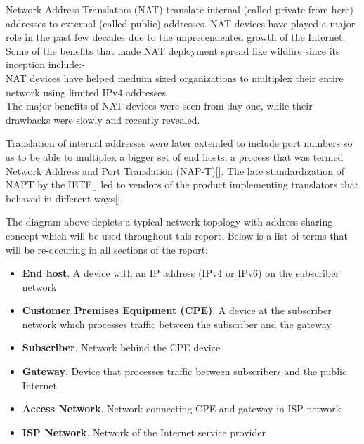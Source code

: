\documentclass[iwp,first]{luthesis}
\begin{document}
Network Address Translators (NAT) translate internal (called private from here) addresses  to external (called public) addresses. NAT devices have played a major role in the past few decades due to the unprecendented growth of the Internet. Some of the benefits that made NAT deployment spread like wildfire since its inception include:- 
\\ NAT devices have helped meduim sized organizations to multiplex their entire network using limited IPv4 addresses
\\ The major benefits of NAT devices were seen from day one, while their drawbacks were slowly and recently revealed.

Translation of internal addresses were later extended to include port numbers so as to be able to multiplex a bigger set of end hosts, a process that was termed Network Address and Port Translation (NAP-T)[]. The late standardization of NAPT by the IETF[] led to vendors of the product implementing translators that behaved in different ways[].


The diagram above depicts a typical network topology with address sharing concept which will be used throughout this report. Below is a list of terms that will be re-occuring in all sections of the report:

\begin{itemize}

\item {\bf End host}. A device with an IP address (IPv4 or IPv6) on the subscriber network

\item {\bf Customer Premises Equipment (CPE)}. A device at the subscriber network which processes traffic between the subscriber and the gateway

\item {\bf Subscriber}. Network behind the CPE device

\item {\bf Gateway}. Device that processes traffic between subscribers and the public Internet.

\item {\bf Access Network}. Network connecting CPE and gateway in ISP network

\item {\bf ISP Network}. Network of the Internet service provider

\end{itemize}
\end{document}
